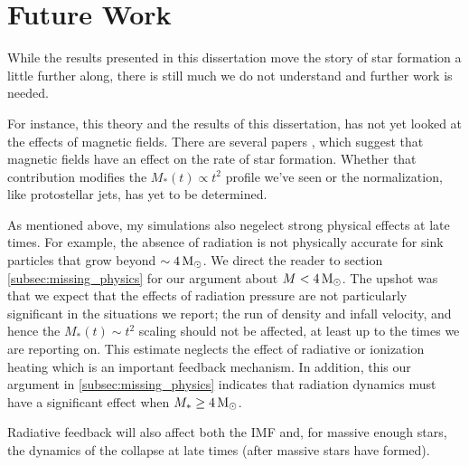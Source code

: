 \documentclass[../dissertation.tex]{subfiles}
\begin{document}
\section{Future Work}
While the results presented in this dissertation move the story of star formation a little further along, 
there is still much we do not understand and further work is needed. 

For instance, this theory and the results of this dissertation, has not yet looked at the effects of magnetic fields. 
There are several papers \citep{2009ApJ...704..891L,2015ApJ...808...48B,2017ApJ...838...40M} , which suggest that magnetic fields have an effect on the rate of star formation. 
Whether that contribution modifies the $M_*(t) \propto t^2$ profile we've seen or the normalization, like protostellar jets, has yet to be determined. 

As mentioned above, my simulations also negelect strong physical effects at late times. 
For example, the absence of radiation is not physically accurate for sink particles that grow beyond $\sim 4 {\,\rm M}_\odot$.
We direct the reader to section \ref{subsec:missing_physics} for our argument about $M < 4 {\,\rm M}_\odot$. 
The upshot was that we expect that the effects of radiation pressure are not particularly significant in the situations we report; 
the run of density and infall velocity, and hence the $M_*(t)\sim t^2$ scaling should not be affected, at least up to the times we are reporting on. 
This estimate neglects the effect of radiative or ionization heating which is an important feedback mechanism. 
In addition, this our argument in \ref{subsec:missing_physics} indicates that radiation dynamics must have a significant effect when $M_* \ge 4 {\,\rm M}_\odot$. 


Radiative feedback will also affect both the IMF and, for massive enough stars, the dynamics of the collapse at late times (after massive stars have formed). 
\end{document}
